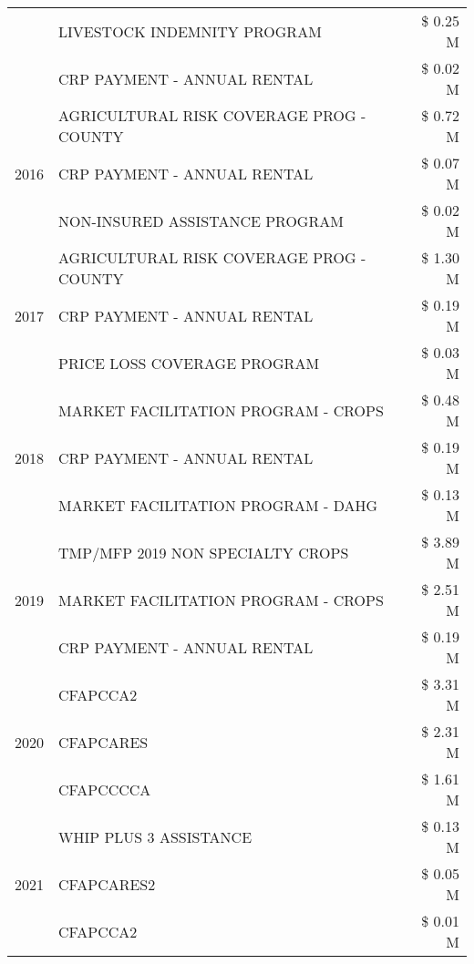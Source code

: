 \begin{tabular}{llr}
 & LIVESTOCK INDEMNITY PROGRAM & \$ 0.25 M \\
 & CRP PAYMENT - ANNUAL RENTAL & \$ 0.02 M \\
\cline{1-3}
\multirow[t]{3}{*}{2016} & AGRICULTURAL RISK COVERAGE PROG - COUNTY & \$ 0.72 M \\
 & CRP PAYMENT - ANNUAL RENTAL & \$ 0.07 M \\
 & NON-INSURED ASSISTANCE PROGRAM & \$ 0.02 M \\
\cline{1-3}
\multirow[t]{3}{*}{2017} & AGRICULTURAL RISK COVERAGE PROG - COUNTY & \$ 1.30 M \\
 & CRP PAYMENT - ANNUAL RENTAL & \$ 0.19 M \\
 & PRICE LOSS COVERAGE PROGRAM & \$ 0.03 M \\
\cline{1-3}
\multirow[t]{3}{*}{2018} & MARKET FACILITATION PROGRAM - CROPS & \$ 0.48 M \\
 & CRP PAYMENT - ANNUAL RENTAL & \$ 0.19 M \\
 & MARKET FACILITATION PROGRAM - DAHG & \$ 0.13 M \\
\cline{1-3}
\multirow[t]{3}{*}{2019} & TMP/MFP 2019 NON SPECIALTY CROPS & \$ 3.89 M \\
 & MARKET FACILITATION PROGRAM - CROPS & \$ 2.51 M \\
 & CRP PAYMENT - ANNUAL RENTAL & \$ 0.19 M \\
\cline{1-3}
\multirow[t]{3}{*}{2020} & CFAPCCA2 & \$ 3.31 M \\
 & CFAPCARES & \$ 2.31 M \\
 & CFAPCCCCA & \$ 1.61 M \\
\cline{1-3}
\multirow[t]{3}{*}{2021} & WHIP PLUS 3 ASSISTANCE & \$ 0.13 M \\
 & CFAPCARES2 & \$ 0.05 M \\
 & CFAPCCA2 & \$ 0.01 M \\
\cline{1-3}
\bottomrule
\end{tabular}
